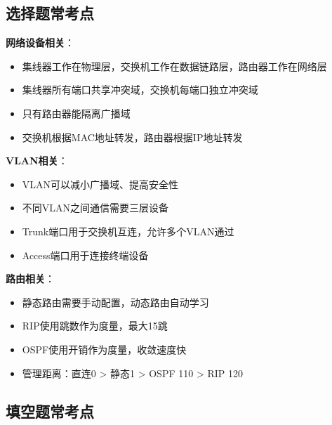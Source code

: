 \documentclass[12pt,a4paper]{ctexart}
\begin{document}
\subsection{选择题常考点}

\begin{keybox}
\textbf{网络设备相关}：
\begin{itemize}[itemsep=0pt]
    \item 集线器工作在物理层，交换机工作在数据链路层，路由器工作在网络层
    \item 集线器所有端口共享冲突域，交换机每端口独立冲突域
    \item 只有路由器能隔离广播域
    \item 交换机根据MAC地址转发，路由器根据IP地址转发
\end{itemize}

\textbf{VLAN相关}：
\begin{itemize}[itemsep=0pt]
    \item VLAN可以减小广播域、提高安全性
    \item 不同VLAN之间通信需要三层设备
    \item Trunk端口用于交换机互连，允许多个VLAN通过
    \item Access端口用于连接终端设备
\end{itemize}

\textbf{路由相关}：
\begin{itemize}[itemsep=0pt]
    \item 静态路由需要手动配置，动态路由自动学习
    \item RIP使用跳数作为度量，最大15跳
    \item OSPF使用开销作为度量，收敛速度快
    \item 管理距离：直连0 > 静态1 > OSPF 110 > RIP 120
\end{itemize}
\end{keybox}

\subsection{填空题常考点}
\end{document}
